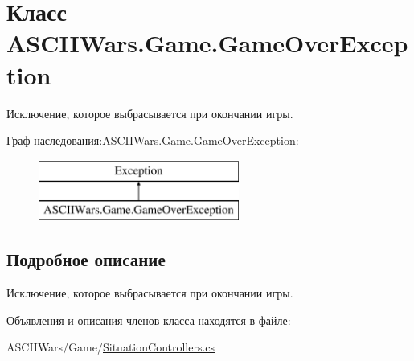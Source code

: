 \hypertarget{class_a_s_c_i_i_wars_1_1_game_1_1_game_over_exception}{}\section{Класс A\+S\+C\+I\+I\+Wars.\+Game.\+Game\+Over\+Exception}
\label{class_a_s_c_i_i_wars_1_1_game_1_1_game_over_exception}


Исключение, которое выбрасывается при окончании игры.  


Граф наследования\+:A\+S\+C\+I\+I\+Wars.\+Game.\+Game\+Over\+Exception\+:\begin{figure}[H]
\begin{center}
\leavevmode
\includegraphics[height=2.000000cm]{class_a_s_c_i_i_wars_1_1_game_1_1_game_over_exception}
\end{center}
\end{figure}


\subsection{Подробное описание}
Исключение, которое выбрасывается при окончании игры. 

Объявления и описания членов класса находятся в файле\+:\begin{DoxyCompactItemize}
\item 
A\+S\+C\+I\+I\+Wars/\+Game/\hyperlink{_situation_controllers_8cs}{Situation\+Controllers.\+cs}\end{DoxyCompactItemize}
